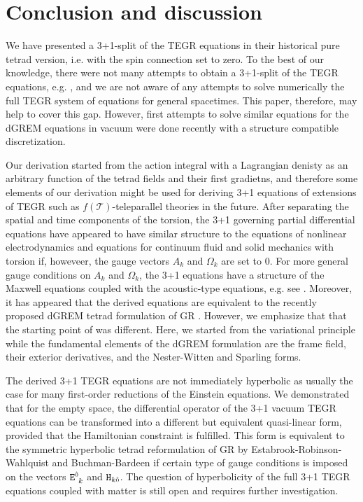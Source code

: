 \documentclass[
10pt, %
a4paper, %
oneside, %
twocolumn,
headinclude,footinclude, %
BCOR5mm, %
]{scrartcl}
\newcommand{\Hfin}[2]{\mathtt{H}_{#2#1}}	%
\newcommand{\Efin}[2]{\mathtt{E}^{#1}_{\phantom{#1}#2}}	%
\newcommand{\indalg}[1]{\hat{\mathsmaller{#1}}}
\newcommand{\Tscal}{\mathcal{T}}		%
\begin{document}
	
	
	\section{Conclusion and discussion}\label{sec.conclusion}
	
	We have presented a 3+1-split of the TEGR equations in their historical pure
	tetrad version, i.e. with the spin connection set to zero. To the best of
	our knowledge, there were not many attempts to obtain a 3+1-split of the
	TEGR equations, e.g. \cite{Maluf2001a,Capozziello2021,Pati2022}, and we are not aware
	of any attempts to solve numerically the full TEGR system of equations for
	general spacetimes. This paper, therefore, may help to cover this gap.
	However, first attempts to solve similar equations for the dGREM equations
	\cite{Olivares2022} in vacuum were done recently \cite{oliynyk2025} with a
	structure compatible discretization.
	
	Our derivation started from the action integral with a
	Lagrangian denisty as an arbitrary function of the tetrad fields and their first gradietns, and therefore some elements of our derivation might be
	used for deriving 3+1 equations of extensions of TEGR such as $ f(\Tscal)
	$-teleparallel theories in the future. After separating the spatial and time
	components of the torsion, the 3+1 governing partial differential equations
	have appeared to have similar structure to the equations of nonlinear
	electrodynamics \cite{DPRZ2017} and equations for continuum fluid and solid
	mechanics with torsion \cite{Torsion2019} if, howeveer, the gauge vectors
	$A_k$ and $\Omega_k$ are set to $0$. For more general gauge conditions on
	$A_k$ and $\Omega_k$, the 3+1 equations have a structure of the Maxwell
	equations coupled with the acoustic-type equations, e.g. see
	\cite{MaxwellGLM}. Moreover, it has appeared that the derived equations are
	equivalent to the recently proposed dGREM tetrad formulation of GR
	\cite{Olivares2022}. However, we emphasize that that the starting point of
	\cite{Olivares2022} was different. Here, we started from the variational
	principle while the fundamental elements of the dGREM formulation are the
	frame field, their exterior derivatives, and the Nester-Witten and Sparling
	forms.
	
	The derived 3+1 TEGR equations are not immediately hyperbolic as usually the
	case for many first-order reductions of the Einstein equations. We
	demonstrated that for the empty space, the differential operator of the 3+1
	vacuum TEGR equations can be transformed into a different but equivalent
	quasi-linear form, provided that the Hamiltonian constraint is fulfilled.
	This form is equivalent to the symmetric hyperbolic tetrad reformulation of
	GR by Estabrook-Robinson-Wahlquist \cite{Estabrook1997} and Buchman-Bardeen
	\cite{Buchman2003} if certain type of gauge conditions is imposed on the
	vectors $\Efin{\indalg{0}}{k}$ and $\Hfin{\indalg{0}}{k}$. The question of
	hyperbolicity of the full 3+1 TEGR equations coupled with matter is still
	open and requires further investigation.
	
\end{document}
